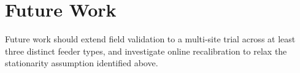 \section{Future Work}
Future work should extend field validation to a multi-site trial across at least three
distinct feeder types, and investigate online recalibration to relax the stationarity
assumption identified above.
